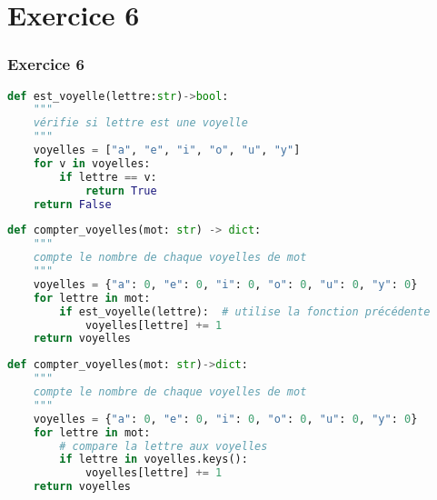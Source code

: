 \documentclass[svgnames,11pt]{beamer}
\begin{document}
\section{Exercice 6}
\begin{frame}[fragile]
    \frametitle{Exercice 6}

\begin{center}
\begin{lstlisting}[language=Python , basicstyle=\ttfamily\small, xleftmargin=0em, xrightmargin=-6em]
def est_voyelle(lettre:str)->bool:
    """
    vérifie si lettre est une voyelle
    """    
    voyelles = ["a", "e", "i", "o", "u", "y"]
    for v in voyelles:
        if lettre == v:
            return True
    return False
\end{lstlisting}
\end{center}    

\end{frame}
\begin{frame}[fragile]

\begin{center}
\begin{lstlisting}[language=Python , basicstyle=\ttfamily\small, xleftmargin=0em, xrightmargin=-6em]
def compter_voyelles(mot: str) -> dict:
    """
    compte le nombre de chaque voyelles de mot
    """
    voyelles = {"a": 0, "e": 0, "i": 0, "o": 0, "u": 0, "y": 0}
    for lettre in mot:
        if est_voyelle(lettre):  # utilise la fonction précédente
            voyelles[lettre] += 1
    return voyelles
\end{lstlisting}
\end{center}    

\end{frame}
\begin{frame}[fragile]

\begin{center}
\begin{lstlisting}[language=Python , basicstyle=\ttfamily\small, xleftmargin=0em, xrightmargin=-6em]
def compter_voyelles(mot: str)->dict:
    """
    compte le nombre de chaque voyelles de mot
    """
    voyelles = {"a": 0, "e": 0, "i": 0, "o": 0, "u": 0, "y": 0}
    for lettre in mot:
        # compare la lettre aux voyelles
        if lettre in voyelles.keys():
            voyelles[lettre] += 1
    return voyelles
\end{lstlisting}
\end{center}    

\end{frame}
\end{document}
